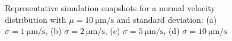 \documentclass[../../master_thesis_np.tex]{subfiles}
\begin{document}
		\begin{figure}[htp]
			\centering\
			\\
			\\
			
			\caption{Representative simulation snapshots for a normal velocity distribution with $\mu = \SI{10}{\um\per\second}$ and standard deviation: (a) $\sigma = \SI{1}{\um\per\second}$, (b) $\sigma = \SI{2}{\um\per\second}$, (c) $\sigma = \SI{5}{\um\per\second}$, (d) $\sigma = \SI{10}{\um\per\second}$}
			\label{fig:lj_vdist_situa}
		\end{figure}
		
\end{document}
